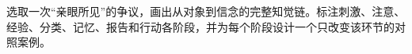 \begin{tcolorbox}[breakable,colback=white,colframe=blue!30!black,title={专题研读任务},fonttitle=\bfseries]
选取一次“亲眼所见”的争议，画出从对象到信念的完整知觉链。标注刺激、注意、经验、分类、记忆、报告和行动各阶段，并为每个阶段设计一个只改变该环节的对照案例。
\end{tcolorbox}

